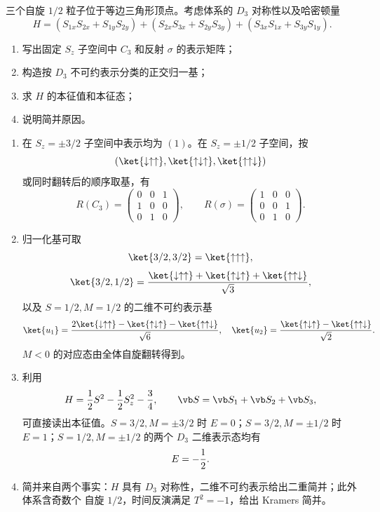 \begin{question}
三个自旋 $1/2$ 粒子位于等边三角形顶点。考虑体系的 $D_3$ 对称性以及哈密顿量
\[
  H=(S_{1x}S_{2x}+S_{1y}S_{2y})+(S_{2x}S_{3x}+S_{2y}S_{3y})
  +(S_{3x}S_{1x}+S_{3y}S_{1y}).
\]
\begin{enumerate}
  \item 写出固定 $S_z$ 子空间中 $C_3$ 和反射 $\sigma$ 的表示矩阵；
  \item 构造按 $D_3$ 不可约表示分类的正交归一基；
  \item 求 $H$ 的本征值和本征态；
  \item 说明简并原因。
\end{enumerate}
\begin{solution}
\begin{enumerate}
  \item 在 $S_z=\pm3/2$ 子空间中表示均为 $(1)$。在 $S_z=\pm1/2$ 子空间，按
  \[
    (\ket{\downarrow\uparrow\uparrow},\ket{\uparrow\downarrow\uparrow},\ket{\uparrow\uparrow\downarrow})
  \]
  或同时翻转后的顺序取基，有
  \[
    R(C_3)=\begin{pmatrix}0&0&1\\1&0&0\\0&1&0\end{pmatrix},
    \qquad
    R(\sigma)=\begin{pmatrix}1&0&0\\0&0&1\\0&1&0\end{pmatrix}.
  \]
  \item 归一化基可取
  \[
    \ket{3/2,3/2}=\ket{\uparrow\uparrow\uparrow},
  \]
  \[
    \ket{3/2,1/2}={\ket{\downarrow\uparrow\uparrow}+\ket{\uparrow\downarrow\uparrow}+\ket{\uparrow\uparrow\downarrow}\over\sqrt3},
  \]
  以及 $S=1/2,M=1/2$ 的二维不可约表示基
  \[
    \ket{u_1}={2\ket{\downarrow\uparrow\uparrow}-\ket{\uparrow\downarrow\uparrow}-\ket{\uparrow\uparrow\downarrow}\over\sqrt6},
    \quad
    \ket{u_2}={\ket{\uparrow\downarrow\uparrow}-\ket{\uparrow\uparrow\downarrow}\over\sqrt2}.
  \]
  $M<0$ 的对应态由全体自旋翻转得到。
  \item 利用
  \[
    H={1\over2}S^2-{1\over2}S_z^2-{3\over4},
    \qquad \vb S=\vb S_1+\vb S_2+\vb S_3,
  \]
  可直接读出本征值。$S=3/2,M=\pm3/2$ 时 $E=0$；$S=3/2,M=\pm1/2$ 时 $E=1$；$S=1/2,M=\pm1/2$ 的两个 $D_3$ 二维表示态均有
  \[
    E=-{1\over2}.
  \]
  \item 简并来自两个事实：$H$ 具有 $D_3$ 对称性，二维不可约表示给出二重简并；此外体系含奇数个 自旋 $1/2$，时间反演满足 $T^2=-1$，给出 Kramers 简并。
\end{enumerate}
\end{solution}
\end{question}

